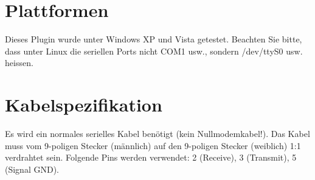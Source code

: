 \documentclass[a4paper]{scrartcl}
\begin{document}
\section{Plattformen}
Dieses Plugin wurde unter Windows XP und Vista getestet. Beachten Sie bitte, dass unter Linux die seriellen Ports nicht COM1 usw., sondern /dev/ttyS0 usw. heissen.

\section{Kabelspezifikation}
Es wird ein normales serielles Kabel ben\"otigt (kein Nullmodemkabel!). Das Kabel muss vom 9-poligen Stecker (m\"annlich) auf den 9-poligen Stecker (weiblich) 1:1 verdrahtet sein. Folgende Pins werden verwendet: 2 (Receive), 3 (Transmit), 5 (Signal GND).\\
\end{document}
